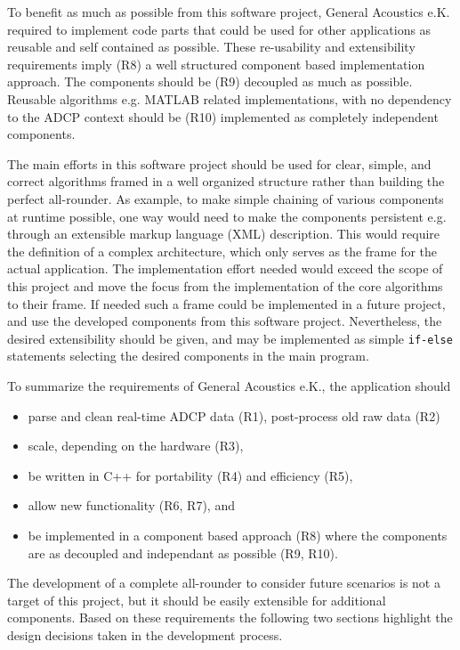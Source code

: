 To benefit as much as possible from this software project, General Acoustics e.K. required to implement code parts that could be used for other applications as reusable and self contained as possible. These re-usability and extensibility requirements imply (R8) a well structured component based implementation approach. The components should be (R9) decoupled as much as possible. Reusable algorithms e.g. MATLAB related implementations, with no dependency to the ADCP context should be (R10) implemented as completely independent components.

The main efforts in this software project should be used for clear, simple, and correct algorithms framed in a well organized structure rather than building the perfect all-rounder. As example, to make simple chaining of various components at runtime possible, one way would need to make the components persistent e.g. through an extensible markup language (XML) description. This would require the definition of a complex architecture, which only serves as the frame for the actual application. The implementation effort needed would exceed the scope of this project and move the focus from the implementation of the core algorithms to their frame. If needed such a frame could be implemented in a future project, and use the developed components from this software project. Nevertheless, the desired extensibility should be given, and may be implemented as simple \texttt{if-else} statements selecting the desired components in the main program.

To summarize the requirements of General Acoustics e.K., the application should
\begin{itemize}
\item parse and clean real-time ADCP data (R1), post-process old raw data (R2)
\item scale, depending on the hardware (R3),
\item be written in C++ for portability (R4) and efficiency (R5),
\item allow new functionality (R6, R7), and
\item be implemented in a component based approach (R8) where the components are as decoupled and independant as possible (R9, R10).
\end{itemize}
The development of a complete all-rounder to consider future scenarios is not a target of this project, but it should be easily extensible for additional components. Based on these requirements the following two sections highlight the design decisions taken in the development process. 

